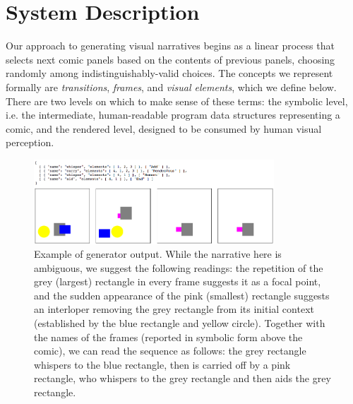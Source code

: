 \section{System Description}

Our approach to generating visual narratives begins as a linear
process that selects next comic panels based on the contents of previous
panels, choosing randomly among indistinguishably-valid choices.
The concepts we represent formally are {\em transitions}, {\em frames}, and
{\em visual elements}, which we define below. There are two levels on which
to make sense of these terms: the symbolic level, i.e. the intermediate,
human-readable program data structures representing a comic, and the
rendered level, designed to be consumed by human visual perception.

\begin{figure}[h]
\centering
\includegraphics[width=9cm]{comicgen-unconstrained-ok.png}
\caption{\small Example of generator output.
While the narrative here is ambiguous, we suggest the following readings:
the repetition of the grey (largest) rectangle in every frame suggests it
as a focal point, and the sudden appearance of the pink (smallest)
rectangle suggests an interloper removing the grey rectangle from its
initial context (established by the blue rectangle and yellow circle).
Together with the names of the frames (reported in symbolic form above the
comic), we can read the sequence as follows: the grey rectangle whispers to
the blue rectangle, then is carried off by a pink rectangle, who whispers
to the grey rectangle and then aids the grey rectangle.
}
\label{fig:out1}
\end{figure}

